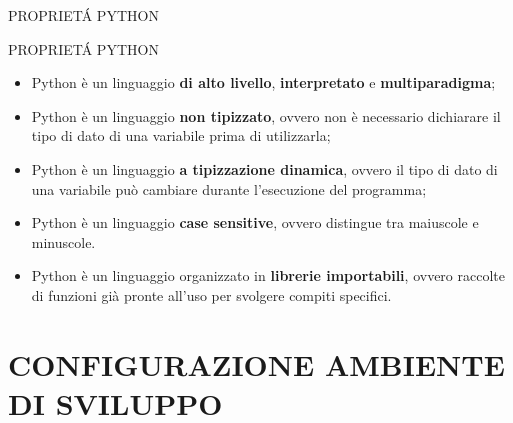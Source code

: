 \documentclass[aspectratio=1610, handout]{beamer}
\begin{document}
\begin{frame}{PROPRIET\'A PYTHON}
    \begin{alertblock}{PROPRIET\'A PYTHON}
        \begin{minipage}{0.98\linewidth}
            \justifying
            \begin{itemize}
                \pause
                \item Python è un linguaggio \textbf{di alto livello}, \textbf{interpretato} e \textbf{multiparadigma};
                \pause
                \item Python è un linguaggio \textbf{non tipizzato}, ovvero non è necessario dichiarare il tipo di dato di una variabile prima di utilizzarla;
                \pause
                \item Python è un linguaggio \textbf{a tipizzazione dinamica}, ovvero il tipo di dato di una variabile può cambiare durante 
                l'esecuzione del programma;
                \pause
                \item Python è un linguaggio \textbf{case sensitive}, ovvero distingue tra maiuscole e minuscole.
                \pause
                \item Python è un linguaggio organizzato in \textbf{librerie importabili}, ovvero raccolte di 
                funzioni già pronte all'uso per svolgere compiti specifici.
                \bigskip
            \end{itemize}
        \end{minipage}
    \end{alertblock}
\end{frame}

\section{CONFIGURAZIONE AMBIENTE DI SVILUPPO}
\end{document}
